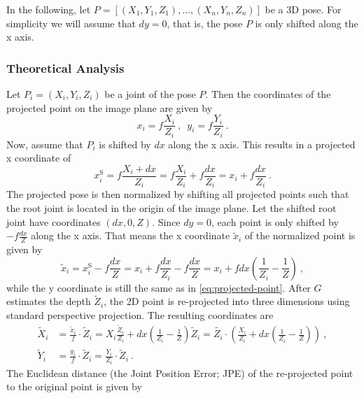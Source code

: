 In the following, let $P = [(X_1, Y_1, Z_1), \dotsc, (X_n, Y_n, Z_n)]$ be a 3D pose.
For simplicity we will assume that $dy = 0$, that is, the pose $P$ is only shifted along the x axis.

\subsubsection{Theoretical Analysis}
\label{sec:x-shift-error-theoretical}
Let $P_i = (X_i, Y_i, Z_i)$ be a joint of the pose $P$.
Then the coordinates of the projected point on the image plane are given by
\begin{equation}
	\label{eq:projected-point}
	x_i = f \frac{X_i}{Z_i} \ ,\enspace y_i = f \frac{Y_i}{Z_i} \ .
\end{equation}
Now, assume that $P_i$ is shifted by $dx$ along the x axis.
This results in a projected x coordinate of
\begin{equation}
	\label{eq:projected-x-y}
	x_i^\mathrm{S} = f \frac{X_i + dx}{Z_i} = f \frac{X_i}{Z_i} + f \frac{dx}{Z_i} = x_i + f \frac{dx}{Z_i}\ .
\end{equation}
The projected pose is then normalized by shifting all projected points such that the root joint is located in the origin of the image plane. 
Let the shifted root joint have coordinates $(dx, 0, Z)$.
Since $dy = 0$, each point is only shifted by $- f \frac{dx}{Z}$ along the x axis.
That means the x coordinate  $\widetilde{x}_i$ of the normalized point is given by
\begin{equation}
	\widetilde{x}_i
	= x_i^\mathrm{S} - f \frac{dx}{Z}
	= x_i + f \frac{dx}{Z_i} - f \frac{dx}{Z}
	= x_i + f dx (\frac{1}{Z_i} - \frac{1}{Z}) \ , 
\end{equation}
while the y coordinate is still the same as in \eqref{eq:projected-point}.
After $G$ estimates the depth $\widetilde{Z}_i$, the 2D point is re-projected into three dimensions using standard perspective projection. 
The resulting coordinates are 
\begin{align}
	\label{eq:re-projected-X}
	\widetilde{X}_i &= \frac{\widetilde{x}_i}{f} \cdot \widetilde{Z}_i
	= X_i \frac{\widetilde{Z}_i}{Z_i} + dx (\frac{1}{Z_i} - \frac{1}{Z}) \widetilde{Z}_i
	= \widetilde{Z_i} \cdot \left( \frac{X_i}{Z_i} + dx \left( \frac{1}{Z_i} - \frac{1}{Z} \right) \right) \ , \\
	\label{eq:re-projected-Y}
	\widetilde{Y}_i &= \frac{y_i}{f} \cdot \widetilde{Z}_i = \frac{Y_i}{Z_i} \cdot \widetilde{Z}_i \ .
\end{align}
The Euclidean distance (the Joint Position Error; JPE) of the re-projected point to the original point is given by
